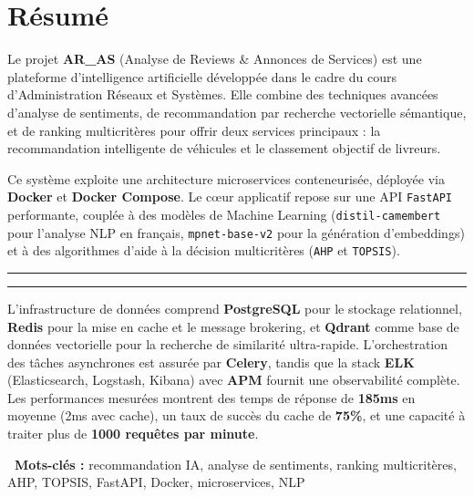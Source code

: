 \documentclass[11pt,a4paper]{report}
\newcommand{\concept}[1]{\textcolor{arasPrimary}{\textbf{#1}}}
\newcommand{\tech}[1]{\texttt{\textcolor{arasDark}{#1}}}
\newcommand{\elegantsep}{\begin{center}\vspace{10pt}\textcolor{arasGray300}{\rule{0.2\textwidth}{0.5pt}\hspace{10pt}\textcolor{arasAccent}{\faStar}\hspace{10pt}\rule{0.2\textwidth}{0.5pt}}\vspace{10pt}\end{center}}
\begin{document}
\chapter*{Résumé}
\begin{infobox}
Le projet \concept{AR\_AS} (Analyse de Reviews \& Annonces de Services) est une plateforme d'intelligence artificielle développée dans le cadre du cours d'Administration Réseaux et Systèmes. Elle combine des techniques avancées d'analyse de sentiments, de recommandation par recherche vectorielle sémantique, et de ranking multicritères pour offrir deux services principaux : la recommandation intelligente de véhicules et le classement objectif de livreurs.
\end{infobox}
\vspace{0.5cm}
Ce système exploite une architecture microservices conteneurisée, déployée via \concept{Docker} et \concept{Docker Compose}. Le cœur applicatif repose sur une API \tech{FastAPI} performante, couplée à des modèles de Machine Learning (\tech{distil-camembert} pour l'analyse NLP en français, \tech{mpnet-base-v2} pour la génération d'embeddings) et à des algorithmes d'aide à la décision multicritères (\tech{AHP} et \tech{TOPSIS}).
\elegantsep
L'infrastructure de données comprend \concept{PostgreSQL} pour le stockage relationnel, \concept{Redis} pour la mise en cache et le message brokering, et \concept{Qdrant} comme base de données vectorielle pour la recherche de similarité ultra-rapide. L'orchestration des tâches asynchrones est assurée par \concept{Celery}, tandis que la stack \concept{ELK} (Elasticsearch, Logstash, Kibana) avec \concept{APM} fournit une observabilité complète.
Les performances mesurées montrent des temps de réponse de \textbf{185ms} en moyenne (2ms avec cache), un taux de succès du cache de \textbf{75\%}, et une capacité à traiter plus de \textbf{1000 requêtes par minute}.
\begin{processbox}
\textbf{\textcolor{arasPrimary}{\faTags\ Mots-clés :}} recommandation IA, analyse de sentiments, ranking multicritères, AHP, TOPSIS, FastAPI, Docker, microservices, NLP
\end{processbox}
\end{document}
